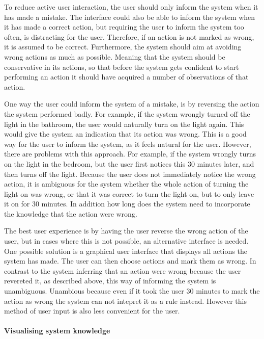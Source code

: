 To reduce active user interaction, the user should only inform the system when it has made a mistake. The interface could also be able to inform the system when it has made a correct action, but requiring the user to inform the system too often, is distracting for the user. Therefore, if an action is not marked as wrong, it is assumed to be correct. Furthermore, the system should aim at avoiding wrong actions as much as possible. Meaning that the system should be conservative in its actions, so that before the system gets confident to start performing an action it should have acquired a number of observations of that action.

One way the user could inform the system of a mistake, is by reversing the action the system performed badly. For example, if the system wrongly turned off the light in the bathroom, the user would naturally turn on the light again. This would give the system an indication that its action was wrong. This is a good way for the user to inform the system, as it feels natural for the user. However, there are problems with this approach. For example, if the system wrongly turns on the light in the bedroom, but the user first notices this 30 minutes later, and then turns off the light. Because the user does not immediately notice the wrong action, it is ambiguous for the system whether the whole action of turning the light on was wrong, or that it was correct to turn the light on, but to only leave it on for 30 minutes. In addition how long does the system need to incorporate the knowledge that the action were wrong.

The best user experience is by having the user reverse the wrong action of the user, but in cases where this is not possible, an alternative interface is needed. One possible solution is a graphical user interface that displays all actions the system has made. The user can then choose actions and mark them as wrong. In contrast to the system inferring that an action were wrong because the user revereted it, as described above, this way of informing the system is unambiguous. Unambious because even if it took the user 30 minutes to mark the action as wrong the system can not intepret it as a rule instead. However this method of user input is also less convenient for the user.

\paragraph{Visualising system knowledge}

